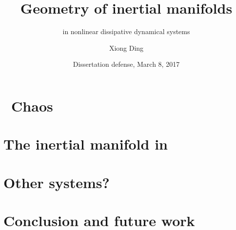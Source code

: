\documentclass[mathserif, handout]{beamer}
\title[Inertial Manifolds] %
{Geometry of inertial manifolds }
\subtitle{in nonlinear dissipative dynamical systems}
\author[X. Ding] %
{Xiong Ding %
}
\institute[Gatech] %
{
  Center for Nonlinear Science \\
  School of Physics \\
  Georgia Institute of Technology
}
\date[Dissertation defense] %
{ %
  Dissertation defense, March 8, 2017
} %
\begin{document}
\frame{\titlepage} %



\section{\Spt\ Chaos}



\section{\KSe}




\section{The inertial manifold in \KSe}



%


\section{Other systems?}


\section{Conclusion and future work}

\end{document}
